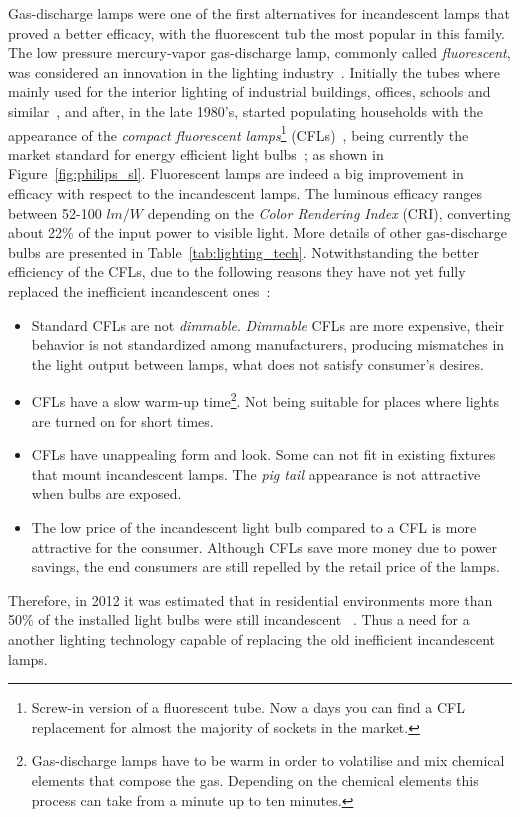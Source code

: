 Gas-discharge lamps were one of the first alternatives for incandescent lamps that proved a better efficacy, with the fluorescent tub the most popular in this family. The low pressure mercury-vapor gas-discharge  lamp, commonly called \emph{fluorescent}, was considered an innovation in the lighting industry~\cite{39inman}. Initially the tubes where mainly used for the interior lighting of industrial buildings, offices, schools and similar~\cite{39oDay,82bouwknegt}, and after, in the late 1980's, started populating households with the appearance of the \emph{compact fluorescent lamps}\footnote{Screw-in version of a fluorescent tube. Now a days you can find a CFL replacement for almost the majority of sockets in the market.} (CFLs)~\cite{82bouwknegt}, being currently the market standard for energy efficient light bulbs~\cite{11EPA}; as shown in Figure~\ref{fig:philips_sl}. Fluorescent lamps are indeed a big improvement in efficacy with respect to the incandescent lamps. The luminous efficacy ranges between 52-100 $lm/W$ depending on the \emph{Color Rendering Index} (CRI), converting about 22\% of the input power to visible light. More details of other gas-discharge bulbs are presented in Table~\ref{tab:lighting_tech}. Notwithstanding the better efficiency of the CFLs, due to the following reasons they have not yet fully replaced the inefficient incandescent ones~\cite{11EPA}:

\begin{itemize}
  \item Standard CFLs are not \emph{dimmable}.  \emph{Dimmable} CFLs are more expensive, their behavior is not standardized among manufacturers, producing mismatches in the light output between lamps, what does not satisfy consumer's desires.

  \item CFLs have a slow warm-up time\footnote{Gas-discharge lamps have to be warm in order to volatilise and mix chemical elements that compose the gas. Depending on the chemical elements this process can take from a minute up to ten minutes. }. Not being suitable for places where lights are turned on for short times.

  \item CFLs have unappealing form and look. Some can not fit in existing fixtures that mount incandescent lamps. The \emph{pig tail} appearance is not attractive when bulbs are exposed.

  \item The low price of the incandescent light bulb compared to a CFL is more attractive for the consumer. Although CFLs save more money due to power savings, the end consumers are still repelled by the retail price of the lamps.

\end{itemize}
Therefore, in 2012 it was estimated that in residential environments more than 50\% of the installed light bulbs were still incandescent ~\cite{13ALED}. Thus a need for a another lighting technology capable of replacing the old inefficient incandescent lamps.

